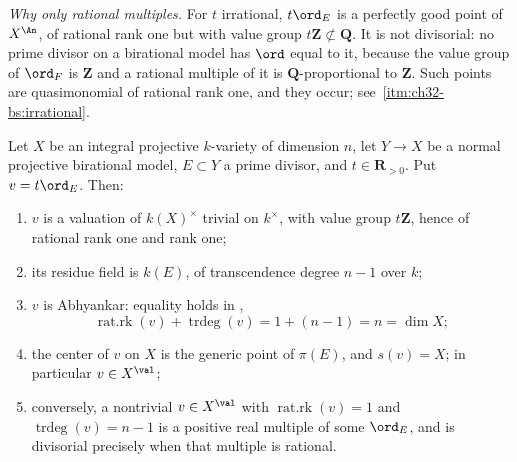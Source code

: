 \emph{Why only rational multiples.}  For $t$ irrational, $t\ord_E$ is a
perfectly good point of $X^{\An}$, of rational rank one but with value
group $t\mathbf Z\not\subset\mathbf Q$.  It is not divisorial: no prime
divisor on a birational model has $\ord$ equal to it, because the value
group of $\ord_F$ is $\mathbf Z$ and a rational multiple of it is
$\mathbf Q$-proportional to $\mathbf Z$.  Such points are quasimonomial
of rational rank one, and they occur; see
\,\cref{itm:ch32-bs:irrational}.

\begin{proposition}
\label{prop:ch32-divisorial-invariants}
Let $X$ be an integral projective $k$-variety of dimension $n$, let
$Y\to X$ be a normal projective birational model, $E\subset Y$ a prime
divisor, and $t\in\mathbf R_{>0}$.  Put $v=t\ord_E$.  Then:
\begin{enumerate}
\item\label{itm:ch32-di:group}
$v$ is a valuation of $k(X)^\times$ trivial on $k^\times$, with value
group $t\mathbf Z$, hence of rational rank one and rank one;
\item\label{itm:ch32-di:residue}
its residue field is $k(E)$, of transcendence degree $n-1$ over $k$;
\item\label{itm:ch32-di:abhyankar}
$v$ is Abhyankar: equality holds in ,
\[
 \operatorname{rat.rk}(v)+\operatorname{trdeg}(v)=1+(n-1)=n=\dim X;
\]
\item\label{itm:ch32-di:center}
the center of $v$ on $X$ is the generic point of $\pi(E)$, and
$s(v)=X$; in particular $v\in X^{\val}$;
\item\label{itm:ch32-di:conversely}
conversely, a nontrivial $v\in X^{\val}$ with
$\operatorname{rat.rk}(v)=1$ and $\operatorname{trdeg}(v)=n-1$ is a
positive real multiple of some $\ord_E$, and is divisorial precisely when
that multiple is rational.
\end{enumerate}
\end{proposition}

